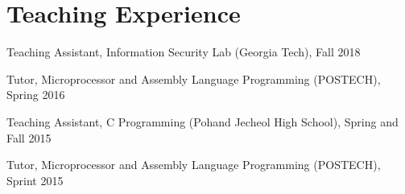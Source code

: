 \section*{Teaching Experience}
\begin{description}

\item Teaching Assistant, Information Security Lab (Georgia Tech), Fall 2018
\item Tutor, Microprocessor and Assembly Language Programming (POSTECH), Spring 2016
\item Teaching Assistant, C Programming (Pohand Jecheol High School), Spring and Fall 2015
\item Tutor, Microprocessor and Assembly Language Programming (POSTECH), Sprint 2015

\end{description}
